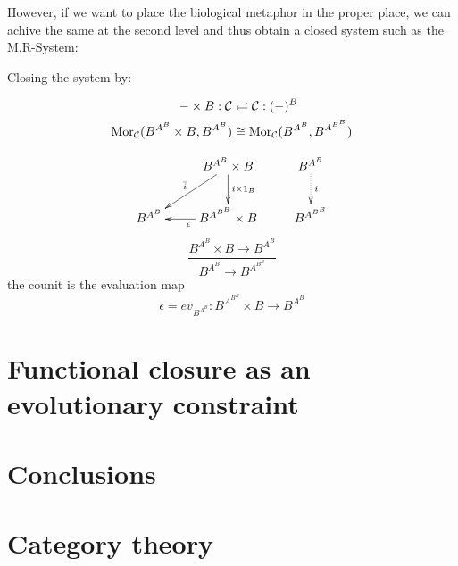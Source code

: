 \documentclass[aps,twocolumn]{revtex4-1}
\begin{document}
However, if we want to place the biological metaphor in the proper place, we can achive the same at the second level and thus obtain a closed system such as the M,R-System:
			
\begin{prooftree}
\end{prooftree}

Closing the system by:

\begin{align*}
- \times B: \mathcal{C} & \rightleftarrows \mathcal{C}: (-)^B\\
\Mor_{\mathcal{C}}(B^{A^B} \times B, B^{A^B}) & \cong  \Mor_{\mathcal{C}}(B^{A^B}, B^{A^{B^B}})
\end{align*}

			$$
			\xymatrix{
			& B^{A^B} \times B \ar[d]^-{i \times 1_B} \ar[dl]_{\bar{i}} & B^{A^B} \ar@{.>}[d]^-{i}\\
			B^{A^B} & B^{A^{B^B}} \times B \ar[l]^{\epsilon} & B^{A^{B^B}}
			}
			$$
		$$
			\frac{B^{A^B} \times B \longrightarrow B^{A^B}}{B^{A^B} \longrightarrow B^{A^{B^B}}}
		$$
		the counit is the evaluation map
		$$
			\epsilon = ev_{B^{A^B}} \colon B^{A^{B^B}} \times B \longrightarrow B^{A^B}
		$$
	
\section{Functional closure as an evolutionary constraint}

\section{Conclusions}


 



\appendix

\section{Category theory}\label{app:CatTh}


%
\end{document}
